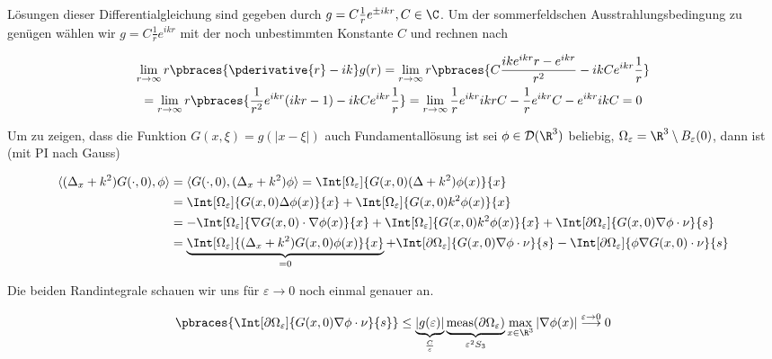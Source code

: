 \begin{solution}
\begin{enumerate}[label = (\roman*)]
Lösungen dieser Differentialgleichung sind gegeben durch $g = C \frac{1}{r}e^{\pm ikr}, C \in \C$. Um der sommerfeldschen Ausstrahlungsbedingung zu genügen
wählen wir $g = C \frac{1}{r}e^{ikr}$ mit der noch unbestimmten Konstante $C$ und rechnen nach

\begin{multline*}
  \lim_{r \to \infty} r \pbraces{\pderivative{r} - i k} g(r)
  =
  \lim_{r \to \infty} r \pbraces{C \frac{ik e^{ikr}r - e^{ikr}}{r^2} - ikC e^{ikr} \frac{1}{r}} \\
  =
  \lim_{r \to \infty} r \pbraces{\frac{1}{r^2} e^{ikr}(ikr - 1) - ikC e^{ikr} \frac{1}{r}}
  =
  \lim_{r \to \infty} \frac{1}{r} e^{ikr}ikr C - \frac{1}{r}e^{ikr}C - e^{ikr}ik C
  =
  0
\end{multline*}

Um zu zeigen, dass die Funktion $G(x, \xi) = g(|x - \xi|)$ auch Fundamentallösung ist sei $\phi \in \mathcal{D}(\R^3)$ beliebig, $\Omega_\varepsilon = \R^3 \setminus B_\varepsilon(0)$, dann ist (mit PI nach Gauss)

\begin{align*}
  \langle (\Delta_x + k^2)G(\cdot, 0), \phi \rangle
  &=
  \langle G(\cdot, 0), (\Delta_x + k^2) \phi \rangle
  =
  \Int[\Omega_\varepsilon]{G(x, 0) (\Delta + k^2) \phi(x)}{x} \\
  &=
  \Int[\Omega_\varepsilon]{G(x, 0) \Delta \phi(x)}{x} + \Int[\Omega_\varepsilon]{G(x, 0)k^2 \phi(x)}{x} \\
  &=
  -\Int[\Omega_\varepsilon]{\nabla G(x, 0) \cdot \nabla \phi(x)}{x}
    + \Int[\Omega_\varepsilon]{G(x, 0)k^2 \phi(x)}{x}
    + \Int[\partial \Omega_\varepsilon]{G(x,0) \nabla \phi \cdot \nu}{s} \\
  &=
  \underbrace{\Int[\Omega_\varepsilon]{(\Delta_x + k^2)G(x, 0) \phi(x)}{x}}_{=0}
    + \Int[\partial \Omega_\varepsilon]{G(x,0) \nabla \phi \cdot \nu}{s}
    - \Int[\partial \Omega_\varepsilon]{\phi \nabla G(x,0) \cdot \nu}{s} \\
\end{align*}

Die beiden Randintegrale schauen wir uns für $\varepsilon \rightarrow 0$ noch einmal genauer an.

\begin{align*}
  \pbraces{\Int[\partial \Omega_\varepsilon]{G(x,0) \nabla \phi \cdot \nu}{s}}
  \leq
  \underbrace{|g(\varepsilon)|}_{\frac{C}{\varepsilon}} \underbrace{\text{meas}(\partial \Omega_\varepsilon)}_{\varepsilon^2 S_3} \max_{x \in \R^3}|\nabla \phi(x)|
  \stackrel{\varepsilon \to 0}{\longrightarrow}
  0
\end{align*}


\end{enumerate}
\end{solution}
